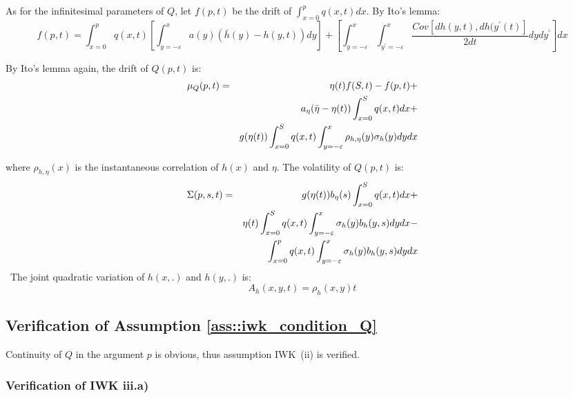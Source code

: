 \documentclass{article}
\begin{document}
As for the infinitesimal parameters of $Q$, let $f(p,t)$ be the drift of $%
\int_{x=0}^{p}q(x,t)dx$. By Ito's lemma:
\begin{equation*}
f(p,t)=\int_{x=0}^{p}q(x,t)\left[ \int_{y=-\varepsilon }^{x}a(y)(\bar{h}%
(y)-h(y,t))dy\right] +\left[ \int_{y=-\varepsilon }^{x}\int_{y^{\prime
}=-\varepsilon }^{x}\frac{Cov[dh(y,t),dh(y^{\prime }(t)]}{2dt}dydy^{\prime }%
\right] dx
\end{equation*}

By Ito's lemma again, the drift of $Q(p,t)$ is:%
\begin{eqnarray}
\mu _{Q}(p,t) &=&\eta (t)f(S,t)-f(p,t)+  \label{mu_Q} \\
&&a_{\eta }(\bar{\eta}-\eta (t))\int_{x=0}^{S}q(x,t){dx+}  \notag \\
&&g(\eta (t))\int_{x=0}^{S}q(x,t)\int_{y=-\varepsilon }^{x}\rho _{h,\eta }(y)%
{\sigma _{h}(y)dydx}  \notag
\end{eqnarray}

where $\rho _{h,\eta }(x)$ is the instantaneous correlation of $h(x)$ and $%
\eta $. The volatility of $Q(p,t)$ is:%
\begin{eqnarray}
\Sigma (p,s,t) &=&g(\eta (t))b_{\eta }(s)\int_{x=0}^{S}q(x,t){dx}+
\label{sigma_Q} \\
&&\eta (t)\int_{x=0}^{S}q(x,t)\int_{y=-\varepsilon }^{x}\sigma
_{h}(y)b_{h}(y,s)dydx-  \notag \\
&&\int_{x=0}^{p}q(x,t)\int_{y=-\varepsilon }^{x}\sigma _{h}(y)b_{h}(y,s)dydx
\notag
\end{eqnarray}%
\ The joint quadratic variation of $h(x,.)$ and $h(y,.)$ is:%
\begin{equation}
A_{h}(x,y,t)=\rho _{h}(x,y)t  \label{Ah}
\end{equation}

\bigskip

\subsection{Verification of Assumption \protect\ref{ass::iwk_condition_Q}}

Continuity of $Q$ in the argument $p$ is obvious, thus assumption IWK\ (ii)
is verified.

\subsubsection{Verification of IWK iii.a)}

\label{sec::verify_continuity_Q}
\end{document}
